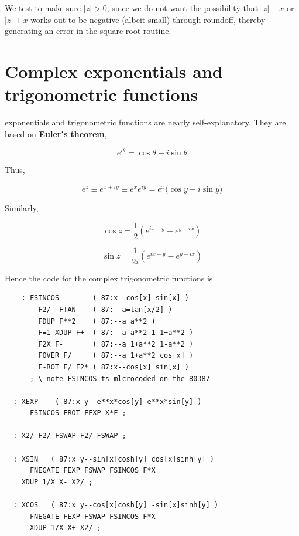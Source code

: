 We test to make sure $\lvert z \rvert > 0$, since we do not want the possibility that $\lvert z \rvert - x$ or $\lvert z \rvert + x$ works out to be negative (albeit small) through roundoff, thereby generating an error in the square root routine.

\section{Complex exponentials and trigonometric functions} 

 exponentials and trigonometric functions are nearly self-explanatory. They are based on \textbf{Euler's theorem},

\begin{equation*}
  e^{i\theta} = \cos\theta + i \sin\theta
\end{equation*}

Thus,

\begin{equation}
  e^z \equiv e^{x + iy} \equiv e^x e^{iy} = e^x\big(\cos y + i \sin y\big)
\end{equation}

Similarly,

\begin{equation}
  \cos z = \frac{1}{2 }\left(e^{ix-y} + e^{y - ix}\right)
\end{equation}

\begin{equation}
  \sin z = \frac{1}{2i}\left(e^{ix-y} - e^{y - ix}\right)
\end{equation}

Hence the code for the complex trigonometric functions is

\begin{lstlisting}
    : FSINCOS        ( 87:x--cos[x] sin[x] )
        F2/  FTAN    ( 87:--a=tan[x/2] )
        FDUP F**2    ( 87:--a a**2 )
        F=1 XDUP F+  ( 87:--a a**2 1 1+a**2 )
        F2X F-       ( 87:--a 1+a**2 1-a**2 )
        FOVER F/     ( 87:--a 1+a**2 cos[x] )
        F-ROT F/ F2* ( 87:x--cos[x] sin[x] )
      ; \ note FSINCOS ts mlcrocoded on the 80387

  : XEXP    ( 87:x y--e**x*cos[y] e**x*sin[y] )
      FSINCOS FROT FEXP X*F ;

  : X2/ F2/ FSWAP F2/ FSWAP ;

  : XSIN   ( 87:x y--sin[x]cosh[y] cos[x]sinh[y] )
      FNEGATE FEXP FSWAP FSINCOS F*X
    XDUP 1/X X- X2/ ;

  : XCOS   ( 87:x y--cos[x]cosh[y] -sin[x]sinh[y] )
      FNEGATE FEXP FSWAP FSINCOS F*X
      XDUP 1/X X+ X2/ ;
\end{lstlisting}

